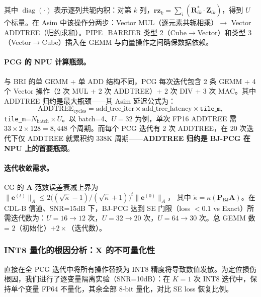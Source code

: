\documentclass{CjC}
\begin{document}
    其中 $\operatorname{diag}(\cdot)$ 表示逐列共轭内积：对第 $k$ 列，$\bm{rz}_k=\sum_{i}(\bm{R}_{ik}^{*}\cdot\bm{Z}_{ik})$，得到 $U$ 个标量。在 Asim 中该操作分两步：Vector MUL（逐元素共轭相乘）$\rightarrow$ Vector ADDTREE（归约求和）。PIPE\_BARRIER 类型 2（Cube$\rightarrow$Vector）和类型 3（Vector$\rightarrow$Cube）插入在 GEMM 与向量操作之间确保数据依赖。
    
    \paragraph{PCG 的 NPU 计算瓶颈。}
    与 BRI 的单 GEMM + 单 ADD 结构不同，PCG 每次迭代包含 2 条 GEMM + 4 个 Vector 操作（2 次 MUL + 2 次 ADDTREE）+ 2 次 DIV + 3 次 MAC。其中 ADDTREE 归约是最大瓶颈——其 Asim 延迟公式为：
    \begin{equation}
        \text{ADDTREE}_{\text{cycles}} = \text{add\_tree\_iter} \times
        \text{add\_tree\_latency} \times \texttt{tile\_m},
    \end{equation}
    \texttt{tile\_m}=$N_{\text{batch}}\times U$。以 batch=4、$U=32$ 为例，单次 FP16 ADDTREE 需
    $33\times 2\times 128 = 8{,}448$ 个周期。而每个 PCG 迭代有 2 次 ADDTREE，在 20 次迭代下仅 ADDTREE 就累积约 338K 周期——\textbf{ADDTREE 归约是 BJ-PCG 在 NPU 上的首要瓶颈}。
    
    \paragraph{迭代收敛需求。}
    CG 的 $\bm{A}$-范数误差衰减上界为
    $\|\bm{e}^{(t)}\|_{A}\leq 2\big((\sqrt{\tilde\kappa}-1)/(\sqrt{\tilde\kappa}+1)\big)^{t}\|\bm{e}^{(0)}\|_{A}$，
    其中 $\tilde\kappa=\kappa(\bm{P}_{\text{BJ}}\bm{A})$。在 CDL-B 信道、SNR=15dB 下，BJ-PCG 达到 SE 门限（loss $<0.1$ vs Exact）所需迭代数为：$U=16\rightarrow 12$ 次，$U=32\rightarrow 20$ 次，$U=64\rightarrow 30$ 次。总 GEMM 数 = $2$（初始化）$+2\times$（迭代数）。
    
    \subsubsection{INT8 量化的根因分析：\texorpdfstring{$\bm{X}$}{X} 的不可量化性}
    
    直接在全 PCG 迭代中将所有操作替换为 INT8 精度将导致数值发散。为定位损伤根因，我们进行了逐变量隔离实验（SNR=10dB）：在 $K=1$ 次 INT8 迭代中，保持单个变量 FP64 不量化，其余全部 8-bit 量化，对比 SE loss 恢复比例。
    
\end{document}
